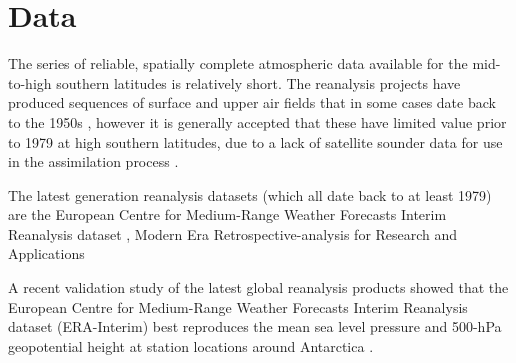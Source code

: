 \section{Data}\label{s:data}

The series of reliable, spatially complete atmospheric data available for the mid-to-high southern latitudes is relatively short. The reanalysis projects have produced sequences of surface and upper air fields that in some cases date back to the 1950s \citep{Kistler2001,Uppala2005,Kobayashi2015}, however it is generally accepted that these have limited value prior to 1979 at high southern latitudes, due to a lack of satellite sounder data for use in the assimilation process \citep{Hines2000}.

The latest generation reanalysis datasets (which all date back to at least 1979) are the European Centre for Medium-Range Weather Forecasts Interim Reanalysis dataset \citep[ERA-Interim][]{Dee2011}, Modern Era Retrospective-analysis for Research and Applications \citep[Merra][]{Rienecker2011} 

A recent validation study of the latest global reanalysis products showed that the European Centre for Medium-Range Weather Forecasts Interim Reanalysis dataset (ERA-Interim) best reproduces the mean sea level pressure and 500-hPa geopotential height at station locations around Antarctica \citep{Bracegirdle2012}.